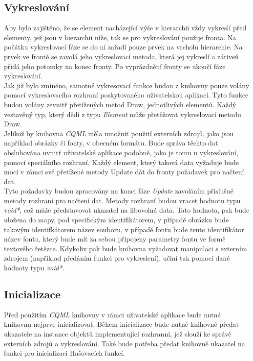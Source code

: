 \documentclass[11pt,twoside,a4paper]{book}
\begin{document}
\subsection {Vykreslování}
Aby bylo zajištěno, že se element nacházející výše v hierarchii vždy vykreslí před elementy, jež jsou v hierarchii níže, tak se pro vykreslování použije fronta. Na počátku vykreslovací fáze se do ní zařadí pouze prvek na vrcholu hierarchie. Na prvek ve frontě se zavolá jeho vykreslovací metoda, která jej vykreslí a záriveň přidá jeho potomky na konec fronty. Po vyprázdnění fronty se ukončí fáze vykreslování.\\
Jak již bylo zmíněno, samotné vykresovací funkce budou z knihovny pouze volány pomocí vykreslovacího rozhraní poskytovaného uživatelskou aplikací. Tyto funkce budou volány zevnitř přetížených metod Draw, jednotlivých elementů. Každý vestavěný typ, který dědí z typu \textit{Element} může přetěžovat vykreslovací metodu Draw.\\
Jelikož by knihovna \textit{CQML} měla umožnit použití externích zdrojů, jako jsou například obrázky či fonty, v obecném formátu. Bude správa těchto dat obsluhována uvnitř uživatelské aplikace podobně, jako je tomu u vykreslování, pomocí speciálního rozhraní. Každý element, který taková data vyžaduje bude moci v rámci své přetížené metody Update dát do fronty požadavek pro načtení dat.\\
Tyto požadavky budou zpracovány na konci fáze \textit{Update} zavoláním příslušné metody rozhraní pro načtení dat. Metody rozhraní budou vracet hodnotu typu \textit{void*}, což může představovat ukazatel na libovolná data. Tato hodnota, pak bude uložena do mapy, pod specifickým identifikátorem, v případě obrázku bude takovým identifkátorem název souboru, v případě fontu bude tento identifikátor název fontu, který bude mít za sebou připojeny parametry fontu ve formě textového řetězce. Kdykoliv pak bude knihovna vyžadovat manipulaci s externím zdrojem (například předáním funkci pro vykreslení), učiní tak pomocí dané hodnoty typu \textit{void*}. \\
\subsection {Inicializace}
Před použitím \textit{CQML} knihovny v rámci uživatelské aplikace bude nutné knihovnu nejprve inicializovat. Během inicializace bude nutné knihovně předat ukazatele na instance objektů implementující rozhranní, jež slouží ke správě externích zdrojů a vykreslování. Také bude potřeba předat knihovně ukazatel na funkci pro inicializaci Hašovacích funkcí.\\
\end{document}
